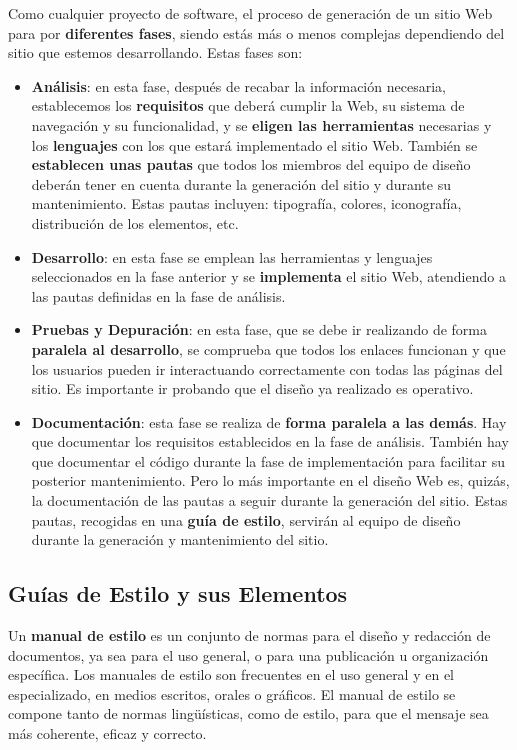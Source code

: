 Como cualquier proyecto de software, el proceso de generación de un sitio Web para por \textbf{diferentes fases}, siendo estás más o menos complejas dependiendo del sitio que estemos desarrollando. Estas fases son:

\begin{itemize}
    \item \textbf{Análisis}: en esta fase, después de recabar la información necesaria, establecemos los \textbf{requisitos} que deberá cumplir la Web, su sistema de navegación y su funcionalidad, y se \textbf{eligen las herramientas} necesarias y los \textbf{lenguajes} con los que estará implementado el sitio Web. También se \textbf{establecen unas pautas} que todos los miembros del equipo de diseño deberán tener en cuenta durante la generación del sitio y durante su mantenimiento. Estas pautas incluyen: tipografía, colores, iconografía, distribución de los elementos, etc.

    \item \textbf{Desarrollo}: en esta fase se emplean las herramientas y lenguajes seleccionados en la fase anterior y se \textbf{implementa} el sitio Web, atendiendo a las pautas definidas en la fase de análisis.

    \item \textbf{Pruebas y Depuración}: en esta fase, que se debe ir realizando de forma \textbf{paralela al desarrollo}, se comprueba que todos los enlaces funcionan y que los usuarios pueden ir interactuando correctamente con todas las páginas del sitio. Es importante ir probando que el diseño ya realizado es operativo.

    \item \textbf{Documentación}: esta fase se realiza de \textbf{forma paralela a las demás}. Hay que documentar los requisitos establecidos en la fase de análisis. También hay que documentar el código durante la fase de implementación para facilitar su posterior mantenimiento. Pero lo más importante en el diseño Web es, quizás, la documentación de las pautas a seguir durante la generación del sitio. Estas pautas, recogidas en una \textbf{guía de estilo}, servirán al equipo de diseño durante la generación y mantenimiento del sitio.
\end{itemize}

\subsection{Guías de Estilo y sus Elementos}
Un \textbf{manual de estilo} es un conjunto de normas para el diseño y redacción de documentos, ya sea para el uso general, o para una publicación u organización específica. Los manuales de estilo son frecuentes en el uso general y en el especializado, en medios escritos, orales o gráficos. El manual de estilo se compone tanto de normas lingüísticas, como de estilo, para que el mensaje sea más coherente, eficaz y correcto.

